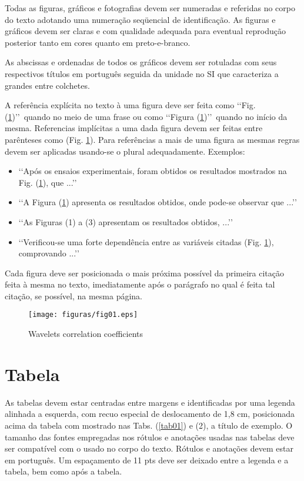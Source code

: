 Todas as figuras, gráficos e fotografias devem ser numeradas e referidas no 
corpo do texto adotando uma numeração seqüencial de identificação. As figuras e 
gráficos devem ser claras e com qualidade adequada para eventual reprodução 
posterior tanto em cores quanto em preto-e-branco.

As abscissas e ordenadas de todos os gráficos devem ser rotuladas com seus 
respectivos títulos em português seguida da unidade no SI que caracteriza a 
grandes entre colchetes. 

A referência explícita no texto à uma figura deve ser feita como 
\lq\lq Fig. (\ref{fig01})\rq\rq\ quando no meio de uma frase ou como 
\lq\lq Figura (\ref{fig01})\rq\rq\ quando no início da mesma. Referencias 
implícitas a uma dada figura devem ser feitas entre parênteses como 
(Fig. \ref{fig01}). Para referências a mais de uma figura as mesmas regras 
devem ser aplicadas usando-se o plural adequadamente. Exemplos:

\begin{itemize}
	\item \lq\lq Após os ensaios experimentais, foram obtidos os resultados 
	mostrados na Fig. (\ref{fig01}), que ...\rq\rq
	\item \lq\lq A Figura (\ref{fig01}) apresenta os resultados obtidos, onde 
	pode-se observar que ...\rq\rq
	\item \lq\lq As Figuras (1) a (3) apresentam os resultados obtidos, 
	...\rq\rq
	\item \lq\lq Verificou-se uma forte dependência entre as variáveis citadas 
	(Fig. \ref{fig01}), comprovando ...\rq\rq
\end{itemize}

Cada figura deve ser posicionada o mais próxima possível da primeira citação 
feita à mesma no texto, imediatamente após o parágrafo no qual é feita tal 
citação, se possível, na mesma página.
\begin{figure}[h]
	\centering
	\label{fig01}
		\texttt{[image: figuras/fig01.eps]}
	\caption{Wavelets correlation coefficients}
\end{figure}

\section{Tabela}

As tabelas devem estar centradas entre margens e identificadas por uma legenda 
alinhada a esquerda, com recuo especial de deslocamento de 1,8 cm, posicionada 
acima da tabela com mostrado nas Tabs. (\ref{tab01}) e (2), a título de 
exemplo. O tamanho das fontes empregadas nos rótulos e anotações usadas nas 
tabelas deve ser compatível com o usado no corpo do texto. Rótulos e anotações 
devem estar em português. Um espaçamento de 11 pts deve ser deixado entre a 
legenda e a tabela, bem como após a tabela. 

